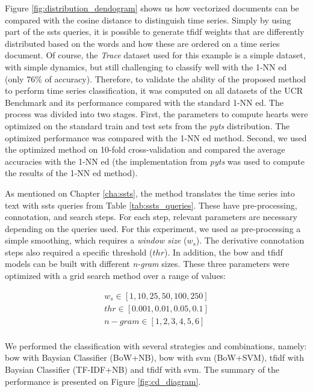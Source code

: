 Figure \ref{fig:distribution_dendogram} shows us how vectorized documents can be compared with the cosine distance to distinguish time series. Simply by using part of the \gls{ssts} queries, it is possible to generate \gls{tfidf} weights that are differently distributed based on the words and how these are ordered on a time series document. Of course, the \textit{Trace} dataset used for this example is a simple dataset, with simple dynamics, but still challenging to classify well with the 1-NN \gls{ed} (only 76\% of accuracy). Therefore, to validate the ability of the proposed method to perform time series classification, it was computed on all datasets of the UCR Benchmark and its performance compared with the standard 1-NN \gls{ed}. The process was divided into two stages. First, the parameters to compute \gls{hearts} were optimized on the standard train and test sets from the \textit{pyts} distribution. The optimized performance was compared with the 1-NN \gls{ed} method. Second, we used the optimized method on 10-fold cross-validation and compared the average accuracies with the 1-NN \gls{ed} (the implementation from \textit{pyts} was used to compute the results of the 1-NN \gls{ed} method).
\par
As mentioned on Chapter \ref{cha:ssts}, the method translates the time series into text with \gls{ssts} queries from Table \ref{tab:ssts_queries}. These have pre-processing, connotation, and search steps. For each step, relevant parameters are necessary depending on the queries used. For this experiment, we used as pre-processing a simple smoothing, which requires a \textit{window size} ($w_s$). The derivative connotation steps also required a specific threshold ($thr$). In addition, the \gls{bow} and \gls{tfidf} models can be built with different \textit{n-gram} sizes. These three parameters were optimized with a grid search method over a range of values:

\begin{equation}
\begin{gathered}
w_s \in [1, 10, 25, 50, 100, 250]\\
thr \in [0.001, 0.01, 0.05, 0.1]\\
n-gram \in [1, 2, 3, 4, 5, 6]\\
\end{gathered}
\end{equation}


We performed the classification with several strategies and combinations, namely: \gls{bow} with Baysian Classifier (BoW+NB), \gls{bow} with \gls{svm} (BoW+SVM), \gls{tfidf} with Baysian Classifier (TF-IDF+NB) and \gls{tfidf} with \gls{svm}. The summary of the performance is presented on Figure \ref{fig:cd_diagram}.

